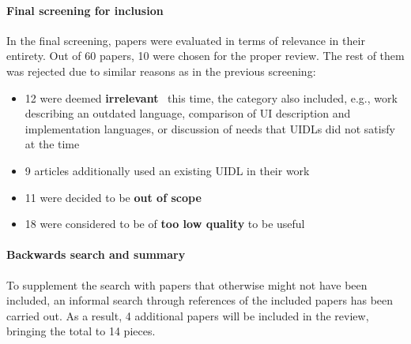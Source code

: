 \paragraph{Final screening for inclusion}

In the final screening, papers were evaluated in terms of relevance in their entirety.
Out of 60 papers, 10 were chosen for the proper review.
The rest of them was rejected due to similar reasons as in the previous screening:
\begin{itemize}
    \item 12 were deemed \textbf{irrelevant} \textendash\ this time, the category also included, e.g., work describing an outdated language, comparison of UI description and implementation languages, or discussion of needs that UIDLs did not satisfy at the time
    \item 9 articles additionally used an existing UIDL in their work
    \item 11 were decided to be \textbf{out of scope}
    \item 18 were considered to be of \textbf{too low quality} to be useful
\end{itemize}

\paragraph{Backwards search and summary}

To supplement the search with papers that otherwise might not have been included, an informal search through references of the included papers has been carried out.
As a result, 4 additional papers will be included in the review, bringing the total to 14 pieces.



